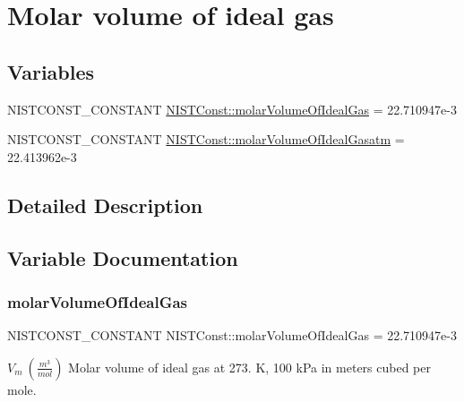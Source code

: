 \hypertarget{group___n_i_s_t_const-_molar_volume}{}\section{Molar volume of ideal gas}
\label{group___n_i_s_t_const-_molar_volume}
\subsection*{Variables}
\begin{DoxyCompactItemize}
\item 
N\+I\+S\+T\+C\+O\+N\+S\+T\+\_\+\+C\+O\+N\+S\+T\+A\+NT \mbox{\hyperlink{group___n_i_s_t_const-_molar_volume_ga3175d5facd09d9633cd05eca4d9246fa}{N\+I\+S\+T\+Const\+::molar\+Volume\+Of\+Ideal\+Gas}} = 22.\+710947e-\/3
\item 
N\+I\+S\+T\+C\+O\+N\+S\+T\+\_\+\+C\+O\+N\+S\+T\+A\+NT \mbox{\hyperlink{group___n_i_s_t_const-_molar_volume_gabc17d301cfbbfc12ffc1caa75c4a4602}{N\+I\+S\+T\+Const\+::molar\+Volume\+Of\+Ideal\+Gasatm}} = 22.\+413962e-\/3
\end{DoxyCompactItemize}


\subsection{Detailed Description}


\subsection{Variable Documentation}
\mbox{\label{group___n_i_s_t_const-_molar_volume_ga3175d5facd09d9633cd05eca4d9246fa}} 
\subsubsection{\texorpdfstring{molar\+Volume\+Of\+Ideal\+Gas}{molarVolumeOfIdealGas}}
{\footnotesize\ttfamily N\+I\+S\+T\+C\+O\+N\+S\+T\+\_\+\+C\+O\+N\+S\+T\+A\+NT N\+I\+S\+T\+Const\+::molar\+Volume\+Of\+Ideal\+Gas = 22.\+710947e-\/3}

$V_m \ (\frac{m^3}{mol})$ Molar volume of ideal gas at 273. K, 100 k\+Pa in meters cubed per mole. \mbox{\label{group___n_i_s_t_const-_molar_volume_gabc17d301cfbbfc12ffc1caa75c4a4602}} 
